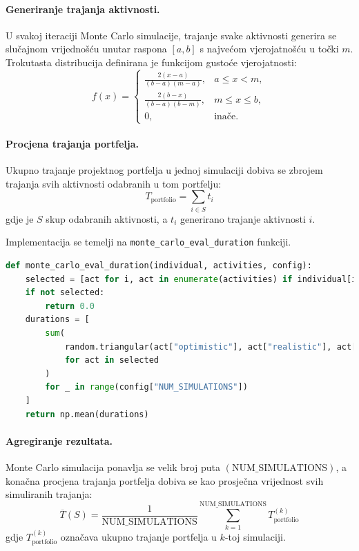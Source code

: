 \paragraph{Generiranje trajanja aktivnosti.}
U svakoj iteraciji Monte Carlo simulacije, trajanje svake aktivnosti generira se slučajnom vrijednošću 
unutar raspona $[a, b]$ s najvećom vjerojatnošću u točki $m$.  
Trokutasta distribucija definirana je funkcijom gustoće vjerojatnosti:
\[
f(x) =
\begin{cases}
\frac{2(x-a)}{(b-a)(m-a)}, & a \leq x < m, \\
\frac{2(b-x)}{(b-a)(b-m)}, & m \leq x \leq b, \\
0, & \text{inače}.
\end{cases}
\]

\paragraph{Procjena trajanja portfelja.}
Ukupno trajanje projektnog portfelja u jednoj simulaciji dobiva se zbrojem trajanja svih aktivnosti odabranih u tom portfelju:
\[
T_{\text{portfolio}} = \sum_{i \in S} t_i
\]
gdje je $S$ skup odabranih aktivnosti, a $t_i$ generirano trajanje aktivnosti $i$.

Implementacija se temelji na \texttt{monte\_carlo\_eval\_duration} funkciji.
\begin{lstlisting}[language=Python, caption={Funkcija za Monte Carlo procjenu trajanja}, label={lst:monte_carlo}, captionpos=b]
def monte_carlo_eval_duration(individual, activities, config):
    selected = [act for i, act in enumerate(activities) if individual[i] == 1]
    if not selected:
        return 0.0
    durations = [
        sum(
            random.triangular(act["optimistic"], act["realistic"], act["pessimistic"])
            for act in selected
        )
        for _ in range(config["NUM_SIMULATIONS"])
    ]
    return np.mean(durations)
\end{lstlisting}


\paragraph{Agregiranje rezultata.}
Monte Carlo simulacija ponavlja se velik broj puta $(\text{NUM\_SIMULATIONS})$, a konačna procjena trajanja portfelja 
dobiva se kao prosječna vrijednost svih simuliranih trajanja:
\[
\overline{T}(S) = \frac{1}{\text{NUM\_SIMULATIONS}} \sum_{k=1}^{\text{NUM\_SIMULATIONS}} T_{\text{portfolio}}^{(k)}
\]
gdje $T_{\text{portfolio}}^{(k)}$ označava ukupno trajanje portfelja u $k$-toj simulaciji.


